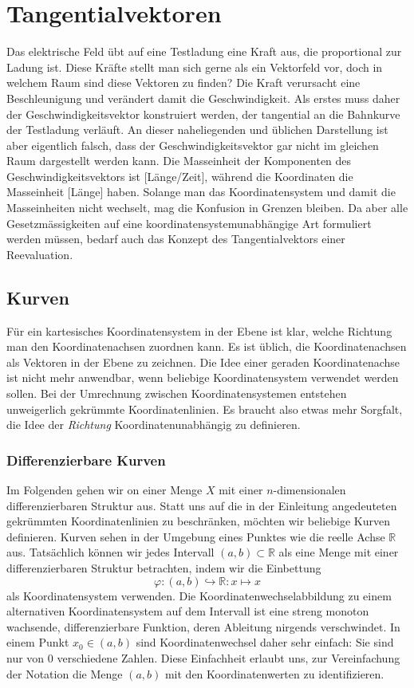 %
%
%
\section{Tangentialvektoren
\label{buch:koordinaten:section:tangentialvektoren}}
Das elektrische Feld übt auf eine Testladung eine Kraft aus, die
proportional zur Ladung ist.
Diese Kräfte stellt man sich gerne als ein Vektorfeld vor, doch
in welchem Raum sind diese Vektoren zu finden?
Die Kraft verursacht eine Beschleunigung und verändert damit 
die Geschwindigkeit.
Als erstes muss daher der Geschwindigkeitsvektor konstruiert werden,
der tangential an die Bahnkurve der Testladung verläuft.
An dieser naheliegenden und üblichen Darstellung ist aber eigentlich
falsch, dass der Geschwindigkeitsvektor gar nicht im gleichen Raum
dargestellt werden kann.
Die Masseinheit der Komponenten des Geschwindigkeitsvektors ist
[Länge/Zeit], während die Koordinaten die Masseinheit [Länge] haben.
Solange man das Koordinatensystem und damit die Masseinheiten nicht
wechselt, mag die Konfusion in Grenzen bleiben.
Da aber alle Gesetzmässigkeiten auf eine koordinatensystemunabhängige
Art formuliert werden müssen, bedarf auch das Konzept des Tangentialvektors
einer Reevaluation.

%
%
\subsection{Kurven}
Für ein kartesisches Koordinatensystem in der Ebene ist klar, welche
Richtung man den Koordinatenachsen zuordnen kann.
Es ist üblich, die Koordinatenachsen als Vektoren in der Ebene
zu zeichnen.
Die Idee einer geraden Koordinatenachse ist nicht mehr anwendbar,
wenn beliebige Koordinatensystem verwendet werden sollen.
Bei der Umrechnung zwischen Koordinatensystemen entstehen unweigerlich
gekrümmte Koordinatenlinien.
Es braucht also etwas mehr Sorgfalt, die Idee der {\em Richtung}
Koordinatenunabhängig zu definieren.

\subsubsection{Differenzierbare Kurven}
Im Folgenden gehen wir on einer Menge $X$ mit einer $n$-dimensionalen
differenzierbaren Struktur aus.
Statt uns auf die in der Einleitung angedeuteten gekrümmten
Koordinatenlinien zu beschränken, möchten wir beliebige Kurven
definieren.
Kurven sehen in der Umgebung eines Punktes wie die reelle Achse
$\mathbb{R}$ aus.
Tatsächlich können wir jedes Intervall $(a,b)\subset\mathbb{R}$ als
eine Menge mit einer differenzierbaren Struktur betrachten, indem
wir die Einbettung
\[
\varphi
\colon
(a,b) \hookrightarrow \mathbb{R}
:
x\mapsto x
\]
als Koordinatensystem verwenden.
Die Koordinatenwechselabbildung zu einem alternativen Koordinatensystem
auf dem Intervall ist eine streng monoton wachsende, differenzierbare
Funktion, deren Ableitung nirgends verschwindet.
In einem Punkt $x_0\in (a,b)$ sind Koordinatenwechsel daher sehr
einfach: Sie sind nur von 0 verschiedene Zahlen.
Diese Einfachheit erlaubt uns, zur Vereinfachung der Notation die Menge
$(a,b)$ mit den Koordinatenwerten zu identifizieren.

